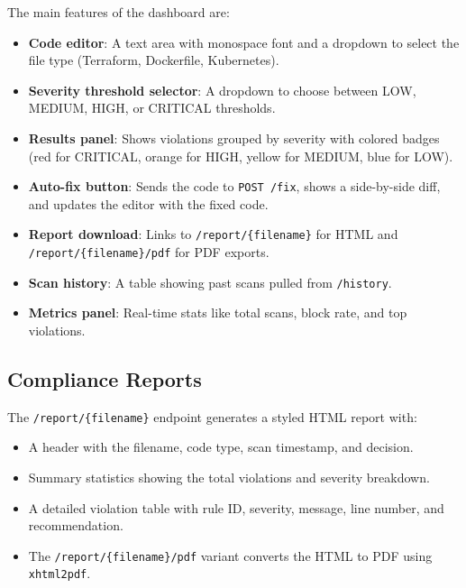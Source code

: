 The main features of the dashboard are:

\begin{itemize}[leftmargin=1.5cm]
  \item \textbf{Code editor}: A text area with monospace font and a dropdown to select the file type (Terraform, Dockerfile, Kubernetes).
  \item \textbf{Severity threshold selector}: A dropdown to choose between LOW, MEDIUM, HIGH, or CRITICAL thresholds.
  \item \textbf{Results panel}: Shows violations grouped by severity with colored badges (red for CRITICAL, orange for HIGH, yellow for MEDIUM, blue for LOW).
  \item \textbf{Auto-fix button}: Sends the code to \texttt{POST /fix}, shows a side-by-side diff, and updates the editor with the fixed code.
  \item \textbf{Report download}: Links to \texttt{/report/\{filename\}} for HTML and \texttt{/report/\{filename\}/pdf} for PDF exports.
  \item \textbf{Scan history}: A table showing past scans pulled from \texttt{/history}.
  \item \textbf{Metrics panel}: Real-time stats like total scans, block rate, and top violations.
\end{itemize}


\subsection{Compliance Reports}

The \texttt{/report/\{filename\}} endpoint generates a styled HTML report with:

\begin{itemize}[leftmargin=1.5cm]
  \item A header with the filename, code type, scan timestamp, and decision.
  \item Summary statistics showing the total violations and severity breakdown.
  \item A detailed violation table with rule ID, severity, message, line number, and recommendation.
  \item The \texttt{/report/\{filename\}/pdf} variant converts the HTML to PDF using \texttt{xhtml2pdf}.
\end{itemize}

